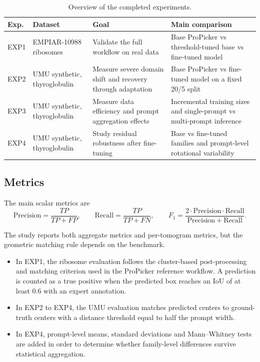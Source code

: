 \documentclass[12pt,a4paper]{report}
\begin{document}
\begin{table}[H]
  \centering
  \small
  \begin{tabularx}{\textwidth}{>{\raggedright\arraybackslash}p{} >{\raggedright\arraybackslash}p{} >{\raggedright\arraybackslash}p{} Y}
    \toprule
    Exp. & Dataset & Goal & Main comparison \\
    \midrule
    EXP1 & EMPIAR-10988 ribosomes & Validate the full workflow on real data & Base ProPicker vs threshold-tuned base vs fine-tuned model \\
    EXP2 & UMU synthetic, thyroglobulin & Measure severe domain shift and recovery through adaptation & Base ProPicker vs fine-tuned model on a fixed 20/5 split \\
    EXP3 & UMU synthetic, thyroglobulin & Measure data efficiency and prompt aggregation effects & Incremental training sizes and single-prompt vs multi-prompt inference \\
    EXP4 & UMU synthetic, thyroglobulin & Study residual robustness after fine-tuning & Base vs fine-tuned families and prompt-level rotational variability \\
    \bottomrule
  \end{tabularx}
  \caption{Overview of the completed experiments.}
  \label{tab:experiment-overview}
\end{table}

\subsection{Metrics}
The main scalar metrics are
\[
\mathrm{Precision}=\frac{TP}{TP+FP}, \qquad
\mathrm{Recall}=\frac{TP}{TP+FN}, \qquad
F_1=\frac{2 \cdot \mathrm{Precision} \cdot \mathrm{Recall}}{\mathrm{Precision}+\mathrm{Recall}}.
\]

The study reports both aggregate metrics and per-tomogram metrics, but the geometric matching rule depends on the benchmark.
\begin{itemize}
  \item In EXP1, the ribosome evaluation follows the cluster-based post-processing and matching criterion used in the ProPicker reference workflow. A prediction is counted as a true positive when the predicted box reaches an IoU of at least \(0.6\) with an expert annotation.
  \item In EXP2 to EXP4, the UMU evaluation matches predicted centers to ground-truth centers with a distance threshold equal to half the prompt width.
  \item In EXP4, prompt-level means, standard deviations and Mann--Whitney tests are added in order to determine whether family-level differences survive statistical aggregation.
\end{itemize}
\end{document}

